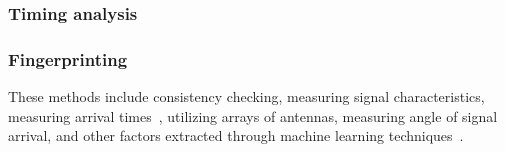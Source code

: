 \subsubsection{Timing analysis}



\subsubsection{Fingerprinting}

These methods include consistency checking, measuring signal characteristics, measuring arrival times~\cite{jedermann2021orbit}, utilizing arrays of antennas, measuring angle of signal arrival, and other factors extracted through machine learning techniques~\cite{oligeri2020past}.
